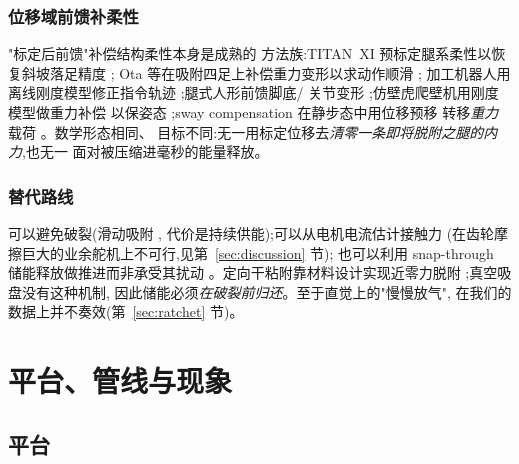 \documentclass[journal]{IEEEtran}
\begin{document}
\subsubsection{位移域前馈补柔性}"标定后前馈"补偿结构柔性本身是成熟的
方法族:TITAN~XI 预标定腿系柔性以恢复斜坡落足精度 \cite{doi2005titan};
Ota 等在吸附四足上补偿重力变形以求动作顺滑 \cite{ota2006deformation};
加工机器人用离线刚度模型修正指令轨迹
\cite{wang2009machining,klimchik2014compliance};腿式人形前馈脚底/
关节变形 \cite{takenaka2005floor};仿壁虎爬壁机用刚度模型做重力补偿
以保姿态 \cite{wang2024gecko};sway compensation 在静步态中用位移预移
转移\emph{重力}载荷 \cite{kurazume2002feedforward}。数学形态相同、
目标不同:无一用标定位移去\emph{清零一条即将脱附之腿的内力},也无一
面对被压缩进毫秒的能量释放。

\subsubsection{替代路线}可以避免破裂(滑动吸附 \cite{yue2024snail},
代价是持续供能);可以从电机电流估计接触力 \cite{wahrburg2018motor}
(在齿轮摩擦巨大的业余舵机上不可行,见第~\ref{sec:discussion} 节);
也可以利用 snap-through 储能释放做推进而非承受其扰动
\cite{tang2020spine}。定向干粘附靠材料设计实现近零力脱附
\cite{kim2008smooth,autumn2006frictional};真空吸盘没有这种机制,
因此储能必须\emph{在破裂前归还}。至于直觉上的"慢慢放气",
在我们的数据上并不奏效(第~\ref{sec:ratchet} 节)。

\section{平台、管线与现象}
\label{sec:phenomenon}

\subsection{平台}
\label{sec:platform}
\end{document}

